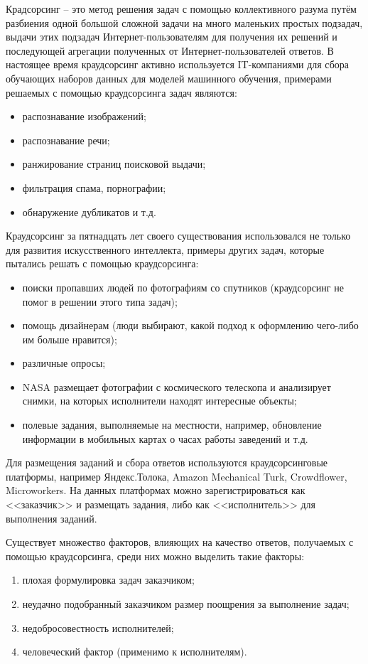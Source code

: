 \documentclass[specification,annotation,times]{itmo-student-thesis}
\begin{document}
\tableofcontents

\startprefacepage

Крадсорсинг -- это метод решения задач с помощью коллективного разума путём разбиения одной большой сложной задачи на много маленьких простых подзадач, выдачи этих подзадач Интернет-пользователям для получения их решений и последующей агрегации полученных от Интернет-пользователей ответов. В настоящее время краудсорсинг активно используется IT-компаниями для сбора обучающих наборов данных для моделей машинного обучения, примерами решаемых с помощью краудсорсинга задач являются:
\begin{itemize}
    \item распознавание изображений;
    \item распознавание речи;
    \item ранжирование страниц поисковой выдачи;
    \item фильтрация спама, порнографии;
    \item обнаружение дубликатов и т.д.
\end{itemize}

Краудсорсинг за пятнадцать лет своего существования использовался не только для развития искусственного интеллекта, примеры других задач, которые пытались решать с помощью краудсорсинга:
\begin{itemize}
    \item поиски пропавших людей по фотографиям со спутников (краудсорсинг не помог в решении этого типа задач);
    \item помощь дизайнерам (люди выбирают, какой подход к оформлению чего-либо им больше нравится);
    \item различные опросы;
    \item NASA размещает фотографии с космического телескопа и анализирует снимки, на которых исполнители находят интересные объекты;
    \item полевые задания, выполняемые на местности, например, обновление информации в мобильных картах о часах работы заведений и т.д.
\end{itemize}

Для размещения заданий и сбора ответов используются краудсорсинговые платформы, например Яндекс.Толока, Amazon Mechanical Turk, Crowdflower, Microworkers. На данных платформах можно зарегистрироваться как <<заказчик>> и размещать задания, либо как <<исполнитель>> для выполнения заданий.

Существует множество факторов, влияющих на качество ответов, получаемых с помощью краудсорсинга, среди них можно выделить такие факторы:
\begin{enumerate}
    \item плохая формулировка задач заказчиком;
    \item неудачно подобранный заказчиком размер поощрения за выполнение задач;
    \item недобросовестность исполнителей;
    \item человеческий фактор (применимо к исполнителям).
\end{enumerate}
\end{document}
